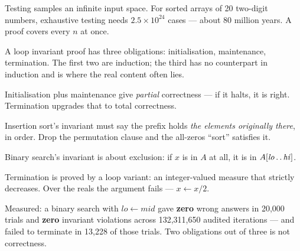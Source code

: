 \begin{chaptersummary}
\begin{tight}
  \item Testing samples an infinite input space. For sorted arrays of 20
        two-digit numbers, exhaustive testing needs $2.5 \times 10^{24}$ cases
        --- about 80 million years. A proof covers every $n$ at once.
  \item A loop invariant proof has three obligations: initialisation,
        maintenance, termination. The first two are induction; the third has no
        counterpart in induction and is where the real content often lies.
  \item Initialisation plus maintenance give \emph{partial} correctness --- if
        it halts, it is right. Termination upgrades that to total correctness.
  \item Insertion sort's invariant must say the prefix holds \emph{the elements
        originally there}, in order. Drop the permutation clause and the
        all-zeros ``sort'' satisfies it.
  \item Binary search's invariant is about exclusion: if $x$ is in $A$ at all,
        it is in $A[\mathit{lo}\mathinner{\ldotp\ldotp}\mathit{hi}]$.
  \item Termination is proved by a loop variant: an integer-valued measure that
        strictly decreases. Over the reals the argument fails --- $x \gets x/2$.
  \item Measured: a binary search with $\mathit{lo} \gets \mathit{mid}$ gave
        \textbf{zero} wrong answers in 20{,}000 trials and \textbf{zero}
        invariant violations across 132{,}311{,}650 audited iterations --- and
        failed to terminate in 13{,}228 of those trials. Two obligations out of
        three is not correctness.
\end{tight}
\end{chaptersummary}

